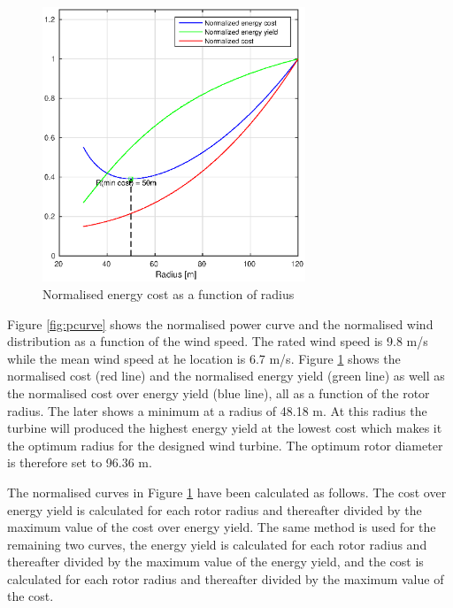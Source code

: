 \begin{figure}[H]
\centering
\includegraphics[width=0.7\textwidth]{Images/optimal_cost.eps} 
\caption{Normalised energy cost as a function of radius}\label{fig:costey}
\end{figure}

Figure \ref{fig:pcurve} shows the normalised power curve and the normalised wind distribution as a function of the wind speed. The rated wind speed is 9.8 m/s while the mean wind speed at he location is 6.7 m/s. Figure \ref{fig:costey} shows the normalised cost (red line) and the normalised energy yield (green line) as well as the normalised cost over energy yield (blue line), all as a function of the rotor radius. The later shows a minimum at a radius of 48.18 m. At this radius the turbine will produced the highest energy yield at the lowest cost which makes it the optimum radius for the designed wind turbine. The optimum rotor diameter is therefore set to 96.36 m.

The normalised curves in Figure \ref{fig:costey} have been calculated as follows. The cost over energy yield is calculated for each rotor radius and thereafter divided by the maximum value of the cost over energy yield. The same method is used for the remaining two curves, the energy yield is calculated for each rotor radius and thereafter divided by the maximum value of the energy yield, and the cost is calculated for each rotor radius and thereafter divided by the maximum value of the cost.